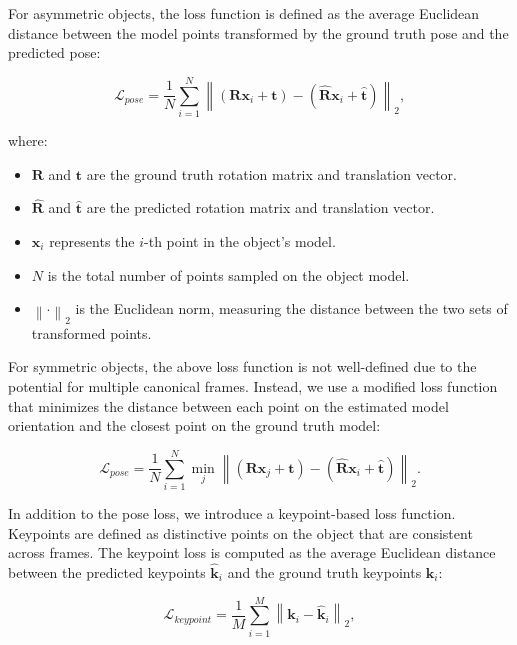 For asymmetric objects, the loss function is defined as the average Euclidean distance between the model points transformed by the ground truth pose and the predicted pose:

\begin{equation}
\mathcal{L}_{pose} = \frac{1}{N} \sum_{i=1}^{N} \left\| (\mathbf{R} \mathbf{x}_i + \mathbf{t}) - (\hat{\mathbf{R}} \mathbf{x}_i + \hat{\mathbf{t}}) \right\|_2,
\end{equation}

\noindent where:

\begin{itemize}
    \item $\mathbf{R}$ and $\mathbf{t}$ are the ground truth rotation matrix and translation vector.
    \item $\hat{\mathbf{R}}$ and $\hat{\mathbf{t}}$ are the predicted rotation matrix and translation vector.
    \item $\mathbf{x}_i$ represents the $i$-th point in the object's model.
    \item $N$ is the total number of points sampled on the object model.
    \item $\left\| \cdot \right\|_2$ is the Euclidean norm, measuring the distance between the two sets of transformed points.
\end{itemize}

\noindent For symmetric objects, the above loss function is not well-defined due to the potential for multiple canonical frames. Instead, we use a modified loss function that minimizes the distance between each point on the estimated model orientation and the closest point on the ground truth model:

\begin{equation}
\mathcal{L}_{pose} = \frac{1}{N} \sum_{i=1}^{N} \min_{j} \left\| (\mathbf{R} \mathbf{x}_j + \mathbf{t}) - (\hat{\mathbf{R}} \mathbf{x}_i + \hat{\mathbf{t}}) \right\|_2.
\end{equation}

\noindent In addition to the pose loss, we introduce a keypoint-based loss function. Keypoints are defined as distinctive points on the object that are consistent across frames. The keypoint loss is computed as the average Euclidean distance between the predicted keypoints $\hat{\mathbf{k}}_i$ and the ground truth keypoints $\mathbf{k}_i$:

\begin{equation}
\mathcal{L}_{keypoint} = \frac{1}{M} \sum_{i=1}^{M} \left\| \mathbf{k}_i - \hat{\mathbf{k}}_i \right\|_2,
\end{equation}

